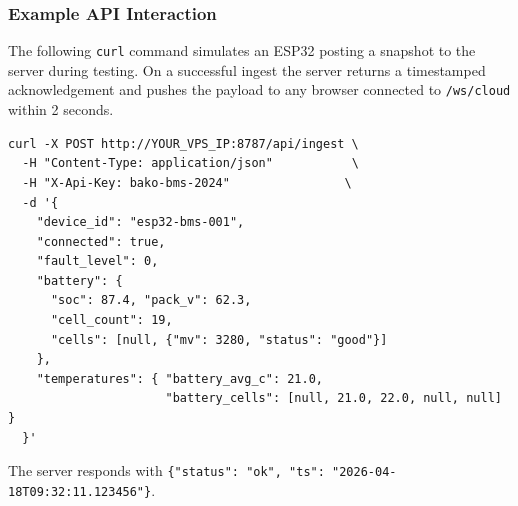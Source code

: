 \subsubsection{Example API Interaction}

The following \texttt{curl} command simulates an ESP32 posting a snapshot to the server during testing. On a successful ingest the server returns a timestamped acknowledgement and pushes the payload to any browser connected to \texttt{/ws/cloud} within 2 seconds.

\begin{verbatim}
curl -X POST http://YOUR_VPS_IP:8787/api/ingest \
  -H "Content-Type: application/json"           \
  -H "X-Api-Key: bako-bms-2024"                \
  -d '{
    "device_id": "esp32-bms-001",
    "connected": true,
    "fault_level": 0,
    "battery": {
      "soc": 87.4, "pack_v": 62.3,
      "cell_count": 19,
      "cells": [null, {"mv": 3280, "status": "good"}]
    },
    "temperatures": { "battery_avg_c": 21.0,
                      "battery_cells": [null, 21.0, 22.0, null, null] }
  }'
\end{verbatim}

\noindent The server responds with \texttt{\{"status": "ok", "ts": "2026-04-18T09:32:11.123456"\}}.
